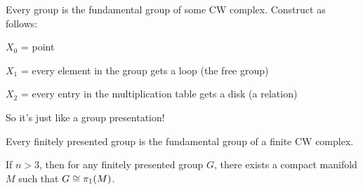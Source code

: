 \documentclass[11pt,leqno,oneside]{amsart}
\numberwithin{thm}{section}
\newcommand{\fund}[1][1]{\pi_{#1}}
\begin{document}
\begin{thm}
  Every group is the fundamental group of some CW complex.  Construct as follows:

  $X_0$ = point

  $X_1$ = every element in the group gets a loop (the free group)

  $X_2$ = every entry in the multiplication table gets a disk (a relation)

  So it's just like a group presentation!
\end{thm}
\begin{thm}
  Every finitely presented group is the fundamental group of a finite CW complex.
\end{thm}
\begin{thm}
  If $n > 3$, then for any finitely presented group $G$, there exists
  a compact manifold $M$ such that $G \isom \fund(M)$.
\end{thm}
\end{document}
